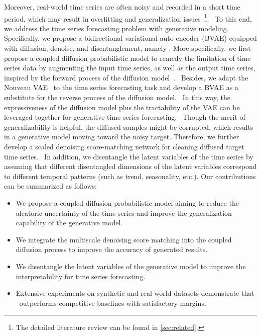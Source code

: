 Moreover, real-world time series are often noisy and recorded in a short time period,  which may result in overfitting and generalization issues~\cite{gamboa2017deep,wang2018gaussian,zou2019complex,arima_2020}{\footnote{The detailed literature review can be found in \cref{sec:related}.}}.~%
To this end, we address the time series forecasting problem with generative modeling.
Specifically, we propose a bidirectional variational auto-encoder (BVAE) equipped with diffusion, denoise, and disentanglement, namely \ourmodel. 
More specifically, 
we first propose a coupled diffusion probabilistic model to remedy the limitation of time series data by augmenting the input time series, as well as the output time series, inspired by the forward process of the diffusion model~\cite{sohl2015deep,ho2020denoising,nichol2021improved,rasul2021autoregressive}.~%
Besides, 
we adapt the Nouveau VAE~\cite{vahdat2020nvae} to the time series forecasting task and develop a BVAE as a substitute for the reverse process of the diffusion model.~%
In this way, the expressiveness of the diffusion model plus the tractability of the VAE can be leveraged together for generative time series forecasting.~%
Though the merit of generalizability is helpful, the diffused samples might be corrupted, which results in a generative model moving toward the noisy target.
Therefore, we further develop a scaled denoising score-matching network for cleaning diffused target time series.~%
In addition, we disentangle the latent variables of the time series by assuming that different disentangled dimensions of the latent variables correspond to different temporal patterns (such as trend, seasonality, etc.). 
Our contributions can be summarized as follows: 

\begin{itemize}
\item
We propose a coupled diffusion probabilistic model aiming to reduce the aleatoric uncertainty of the time series and improve the generalization capability of the generative model. 

\item
We integrate the multiscale denoising score matching into the coupled diffusion process to improve the accuracy of generated results. 

\item 
We disentangle the latent variables of the generative model to improve the interpretability for time series forecasting. 

\item 
Extensive experiments on synthetic and real-world datasets demonstrate that \ourmodel ~outperforms  competitive  baselines with satisfactory  margins.

\end{itemize}

